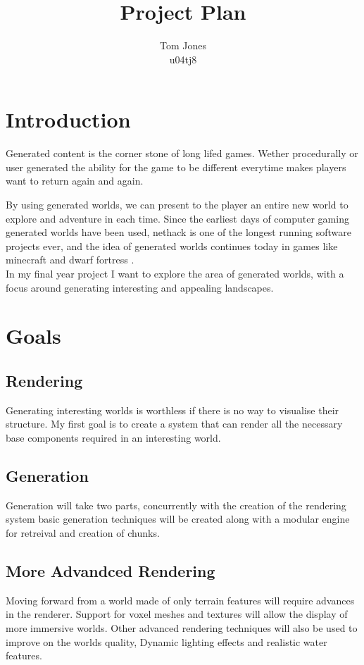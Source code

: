 \documentclass[a4paper,12pt,notitlepage]{article}
\begin{document}
\title{Project Plan}
\author{Tom Jones\\u04tj8}
\maketitle

\section{Introduction}
Generated content is the corner stone of long lifed games. Wether procedurally or
user generated the ability for the game to be different everytime makes players 
want to return again and again.

By using generated worlds, we can present to the player an entire new world to 
explore and adventure in each time. Since the earliest days of computer gaming
generated worlds have been used, nethack \cite{nethack}
is one of the longest running software
projects ever, and the idea of generated worlds continues today in games like 
minecraft \cite{minecraft} and dwarf fortress \cite{dwarffortress}.\\

\noindent
In my final year project I want to explore the area of generated worlds, with a 
focus around generating interesting and appealing landscapes.

\section{Goals}
\subsection*{Rendering}
Generating interesting worlds is worthless if there is no way to visualise their
structure. My first goal is to create a system that can render all the necessary
base components required in an interesting world.

\subsection*{Generation}
Generation will take two parts, concurrently with the creation of the rendering 
system basic generation techniques will be created along with a modular engine
for retreival and creation of chunks.

\subsection*{More Advandced Rendering}
Moving forward from a world made of only terrain features will require advances
in the renderer. Support for voxel meshes and textures will allow the display of 
more immersive worlds. Other advanced rendering techniques will also be used to
improve on the worlds quality, Dynamic lighting effects and realistic water 
features.
\end{document}
